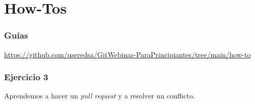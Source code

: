 \section{How-Tos}

\begin{frame}\frametitle{Guías}
\url{https://github.com/useredsa/GitWebinar-ParaPrincipiantes/tree/main/how-to}
\end{frame}

\begin{frame}\frametitle{Ejercicio 3}
\begin{center}
    \Huge
    Aprendemos a hacer un \textit{pull request} y a resolver un conflicto.
\end{center}
\end{frame}


